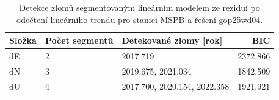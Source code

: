 \begin{table}[htbp]
\caption{Detekce zlomů segmentovaným lineárním modelem ze reziduí po odečtení lineárního trendu pro stanici MSPB a řešení gop25wd04.}
\label{tab:gop25wd04_stcd_mspb_detr_weighted_1seg_jumps_piecewise_bic}
\begin{tabular}{lllr}
\toprule
Složka & Počet segmentů & Detekované zlomy [rok] & BIC \\
\midrule
dE & 2 & 2017.719 & 2372.866 \\
dN & 3 & 2019.675, 2021.034 & 1842.509 \\
dU & 4 & 2017.700, 2020.154, 2022.358 & 1921.921 \\
\bottomrule
\end{tabular}
\end{table}

